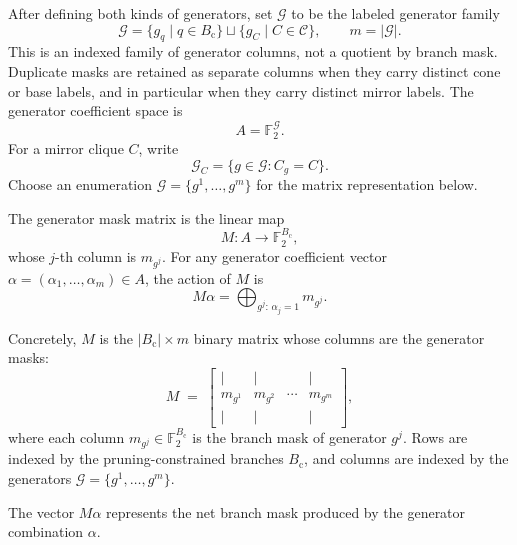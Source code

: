 After defining both kinds of generators, set $\mathcal{G}$ to be the labeled generator family
\[
\mathcal{G}
=
\{g_q\mid q\in B_{\mathrm{c}}\}\sqcup\{g_C\mid C\in\mathcal{C}\},
\qquad
m=\lvert\mathcal{G}\rvert.
\]
This is an indexed family of generator columns, not a quotient by branch mask. Duplicate masks are retained as separate columns when they carry distinct cone or base labels, and in particular when they carry distinct mirror labels. The generator coefficient space is
\[
A = \mathbb{F}_2^{\mathcal{G}}.
\]
For a mirror clique $C$, write
\[
\mathcal{G}_C=\{g\in\mathcal{G}: C_g=C\}.
\]
Choose an enumeration $\mathcal{G}=\{g^1,\ldots,g^m\}$ for the matrix representation below.

\begin{definition}
\label{def:mask-matrix}
The generator mask matrix is the linear map
\[
M: A \to \mathbb{F}_2^{B_{\mathrm{c}}},
\]
whose $j$-th column is $m_{g^j}$. For any generator coefficient vector $\alpha=(\alpha_1,\ldots,\alpha_m)\in A$, the action of $M$ is
\[
M\alpha = \bigoplus_{g^j:\,\alpha_j = 1} m_{g^j}.
\]
\end{definition}

\noindent Concretely, $M$ is the $\lvert B_{\mathrm{c}}\rvert\times m$ binary matrix whose columns are the generator masks:
\[
M \;=\;
\begin{bmatrix}
  \Big| & \Big| & & \Big| \\[4pt]
  m_{g^1} & m_{g^2} & \cdots & m_{g^m} \\[4pt]
  \Big| & \Big| & & \Big|
\end{bmatrix},
\]
where each column $m_{g^j}\in\mathbb{F}_2^{B_{\mathrm{c}}}$ is the branch mask of generator $g^j$.
Rows are indexed by the pruning-constrained branches $B_{\mathrm{c}}$, and columns are indexed by the generators $\mathcal{G}=\{g^1,\ldots,g^m\}$.

The vector $M\alpha$ represents the net branch mask produced by the generator combination $\alpha$.
